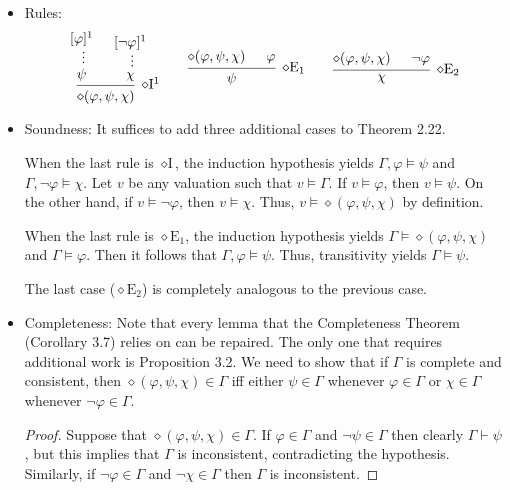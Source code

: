 \documentclass[a4paper]{article}
\begin{document}
\section{}
\begin{itemize}
\item Rules:
  \[
    \begin{prooftree}
      \hypo{[\varphi]^{1}}
      \ellipsis{}{\psi}
      \hypo{[\lnot\varphi]^{1}}
      \ellipsis{}{\chi}
      \infer2[$\diamond$I$^1$]{\diamond(\varphi,\psi,\chi)}
    \end{prooftree}
    \qquad
    \begin{prooftree}
      \hypo{\diamond(\varphi,\psi,\chi)}
      \hypo{\varphi}
      \infer2[$\diamond$E$_{1}$]{\psi}
    \end{prooftree}
    \qquad
    \begin{prooftree}
      \hypo{\diamond(\varphi,\psi,\chi)}
      \hypo{\lnot\varphi}
      \infer2[$\diamond$E$_{2}$]{\chi}
    \end{prooftree}
  \]
\item Soundness: It suffices to add three additional cases to Theorem 2.22.

  When the last rule is $\diamond\text{I}$, the induction hypothesis yields $\Gamma,\varphi \models \psi$ and $\Gamma,\lnot\varphi \models \chi$.
  Let $v$ be any valuation such that $v \models \Gamma$.
  If $v \models \varphi$, then $v \models \psi$.
  On the other hand, if $v \models \lnot\varphi$, then $v \models \chi$.
  Thus, $v \models \diamond(\varphi,\psi,\chi)$ by definition.

  When the last rule is $\diamond\text{E}_{1}$, the induction hypothesis yields $\Gamma \models \diamond(\varphi,\psi,\chi)$ and $\Gamma \models \varphi$.
  Then it follows that $\Gamma,\varphi \models \psi$.
  Thus, transitivity yields $\Gamma \models \psi$.

  The last case ($\diamond\text{E}_{2}$) is completely analogous to the previous case.
\item Completeness: Note that every lemma that the Completeness Theorem (Corollary 3.7) relies on can be repaired.
  The only one that requires additional work is Proposition 3.2.
  We need to show that if $\Gamma$ is complete and consistent, then $\diamond(\varphi,\psi,\chi) \in \Gamma$ iff either $\psi \in \Gamma$ whenever $\varphi \in \Gamma$ or $\chi \in \Gamma$ whenever $\lnot \varphi \in \Gamma$.
  \begin{proof}
    Suppose that $\diamond(\varphi,\psi,\chi) \in \Gamma$.
    If $\varphi \in \Gamma$ and $\lnot\psi \in \Gamma$ then clearly $\Gamma \vdash \psi$, but this implies that $\Gamma$ is inconsistent, contradicting the hypothesis.
    Similarly, if $\lnot\varphi\in \Gamma$ and $\lnot \chi \in \Gamma$ then $\Gamma$ is inconsistent.


\end{proof}
\end{itemize}
\end{document}

